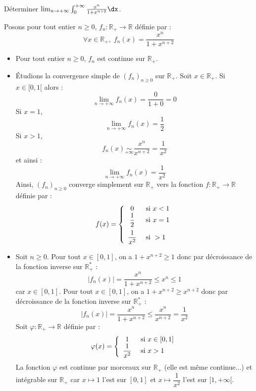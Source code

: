 \documentclass[a4paper,10pt]{report}
\begin{document}
\begin{Exa} Déterminer $\lim_{n \rightarrow + \infty}\int_{0}^{ + \infty} \frac{x^{n}}{1 + x^{n + 2}} \dx$.
\end{Exa}

\corr Posons pour tout entier $n \geq 0$, $f_n : \mathbb{R}_+ \rightarrow \mathbb{R}$ définie par :
$$ \forall x \in \mathbb{R}_+, \; f_n(x) = \frac{x^{n}}{1 + x^{n + 2}}$$
\begin{itemize}
\item Pour tout entier $n \geq 0$, $f_n$ est continue sur $\mathbb{R}_+$.
\item Étudions la convergence simple de $(f_n)_{n \geq 0}$ sur $\mathbb{R}_+$. Soit $x \in \mathbb{R}_+$. Si $x \in [0,1[$ alors :
$$ \lim_{n \rightarrow + \infty} f_n(x)= \dfrac{0}{1+0} = 0$$
Si $x=1$,
$$ \lim_{n \rightarrow + \infty} f_n(x)= \dfrac{1}{2}$$
Si $x>1$,
$$ f_n(x) \underset{+ \infty}{\sim} \dfrac{x^n}{x^{n+2}} = \dfrac{1}{x^2}$$
et ainsi :
$$ \lim_{n \rightarrow + \infty} f_n(x) = \dfrac{1}{x^2}$$
Ainsi, $(f_n)_{n \geq 0}$ converge simplement sur $\mathbb{R}_+$ vers la fonction $f : \mathbb{R}_+ \rightarrow \mathbb{R}$ définie par :
$$ f(x) = \left\lbrace \begin{array}{cl}
0 & \hbox{ si } x<1 \\
\dfrac{1}{2} & \hbox{ si } x=1 \\[0.3cm]
\dfrac{1}{x^2} & \hbox{ si } >1  
\end{array}\right.$$
\item Soit $n \geq 0$. Pour tout $x \in [0,1]$, on a $1+x^{n+2}\geq 1$ donc par décroissance de la fonction inverse sur $\mathbb{R}_+^*$ :
$$ \left\vert f_n(x) \right\vert = \dfrac{x^n}{1+x^{n+2}} \leq  x^n \leq 1$$
car $x \in [0,1]$. Pour tout $x \in [0,1]$, on a $1+x^{n+2}\geq x^{n+2}$ donc par décroissance de la fonction inverse sur $\mathbb{R}_+^*$ :
$$ \left\vert f_n(x) \right\vert = \dfrac{x^n}{1+x^{n+2}} \leq \dfrac{x^n}{x^{n+2}}= \dfrac{1}{x^2}$$
Soit $\varphi : \mathbb{R}_+ \rightarrow \mathbb{R}$ définie par :
$$ \varphi(x) = \left\lbrace \begin{array}{cl}
1 & \hbox{ si } x \in [0,1] \\
\dfrac{1}{x^2} & \hbox{ si } x>1 \\
\end{array}\right.$$
La fonction $\varphi$ est continue par morceaux sur $\mathbb{R}_+$ (elle est même continue...) et intégrable sur $\mathbb{R}_+$ car $x \mapsto 1$ l'est sur $[0,1]$ et $x \mapsto \dfrac{1}{x^2}$ l'est sur $[1, + \infty[$. 
\end{itemize}
\end{document}
